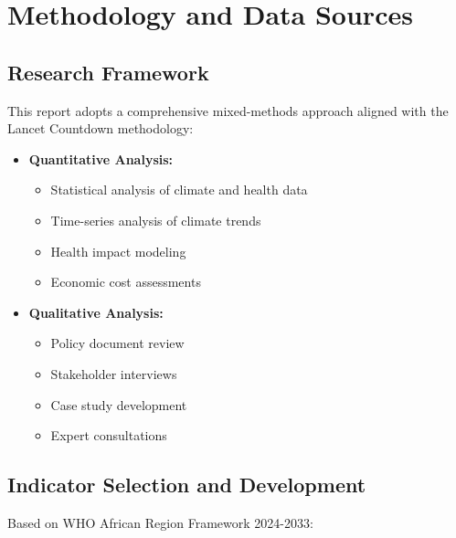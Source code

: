 \section{Methodology and Data Sources}
\label{sec:methods}

\subsection{Research Framework}
This report adopts a comprehensive mixed-methods approach aligned with the Lancet Countdown methodology:

\begin{itemize}
    \item \textbf{Quantitative Analysis:}
    \begin{itemize}
        \item Statistical analysis of climate and health data
        \item Time-series analysis of climate trends
        \item Health impact modeling
        \item Economic cost assessments
    \end{itemize}
    
    \item \textbf{Qualitative Analysis:}
    \begin{itemize}
        \item Policy document review
        \item Stakeholder interviews
        \item Case study development
        \item Expert consultations
    \end{itemize}
\end{itemize}

\subsection{Indicator Selection and Development}
Based on WHO African Region Framework 2024-2033:

